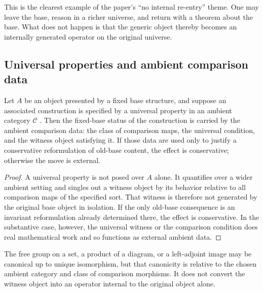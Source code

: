 \begin{remark}
This is the clearest example of the paper's ``no internal re-entry'' theme. One may leave the base, reason in a richer universe, and return with a theorem about the base. What does not happen is that the generic object thereby becomes an internally generated operator on the original universe.
\end{remark}

\subsection{Universal properties and ambient comparison data}

\begin{proposition}\label{prop:app-universal-comparison}
Let $A$ be an object presented by a fixed base structure, and suppose an associated construction is specified by a universal property in an ambient category $\mathcal{C}$ \citep{MacLane1998}. Then the fixed-base status of the construction is carried by the ambient comparison data: the class of comparison maps, the universal condition, and the witness object satisfying it. If those data are used only to justify a conservative reformulation of old-base content, the effect is conservative; otherwise the move is external.
\end{proposition}

\begin{proof}
A universal property is not posed over $A$ alone. It quantifies over a wider ambient setting and singles out a witness object by its behavior relative to all comparison maps of the specified sort. That witness is therefore not generated by the original base object in isolation. If the only old-base consequence is an invariant reformulation already determined there, the effect is conservative. In the substantive case, however, the universal witness or the comparison condition does real mathematical work and so functions as external ambient data.
\end{proof}

\begin{example}
The free group on a set, a product of a diagram, or a left-adjoint image may be canonical up to unique isomorphism, but that canonicity is relative to the chosen ambient category and class of comparison morphisms. It does not convert the witness object into an operator internal to the original object alone.
\end{example}

